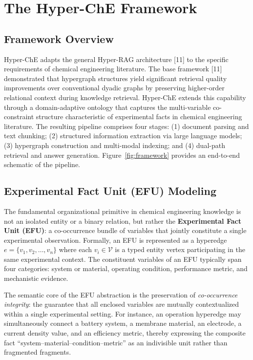 
\section{The Hyper-ChE Framework}
\label{sec:framework}

\subsection{Framework Overview}
\label{subsec:overview}

Hyper-ChE adapts the general Hyper-RAG architecture [11] to the specific requirements of chemical engineering literature. The base framework [11] demonstrated that hypergraph structures yield significant retrieval quality improvements over conventional dyadic graphs by preserving higher-order relational context during knowledge retrieval. Hyper-ChE extends this capability through a domain-adaptive ontology that captures the multi-variable co-constraint structure characteristic of experimental facts in chemical engineering literature. The resulting pipeline comprises four stages: (1) document parsing and text chunking; (2) structured information extraction via large language models; (3) hypergraph construction and multi-modal indexing; and (4) dual-path retrieval and answer generation. Figure~\ref{fig:framework} provides an end-to-end schematic of the pipeline.

\subsection{Experimental Fact Unit (EFU) Modeling}
\label{subsec:efu}

The fundamental organizational primitive in chemical engineering knowledge is not an isolated entity or a binary relation, but rather the \textbf{Experimental Fact Unit (EFU)}: a co-occurrence bundle of variables that jointly constitute a single experimental observation. Formally, an EFU is represented as a hyperedge $e = \{v_1, v_2, \ldots, v_n\}$ where each $v_i \in \mathcal{V}$ is a typed entity vertex participating in the same experimental context. The constituent variables of an EFU typically span four categories: system or material, operating condition, performance metric, and mechanistic evidence.

The semantic core of the EFU abstraction is the preservation of \emph{co-occurrence integrity}: the guarantee that all enclosed variables are mutually contextualized within a single experimental setting. For instance, an operation hyperedge may simultaneously connect a battery system, a membrane material, an electrode, a current density value, and an efficiency metric, thereby expressing the composite fact ``system--material--condition--metric'' as an indivisible unit rather than fragmented fragments.

